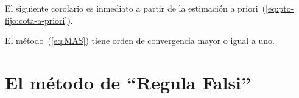 El siguiente corolario es inmediato a partir de la estimación a
priori~(\ref{eq:pto-fijo:cota-a-priori}).
\begin{corollary}
  El método~(\ref{eq:MAS}) tiene orden de convergencia mayor o igual a
  uno.
\end{corollary}

\section{El método de ``Regula Falsi''}
\label{sec:regula-falsi}

